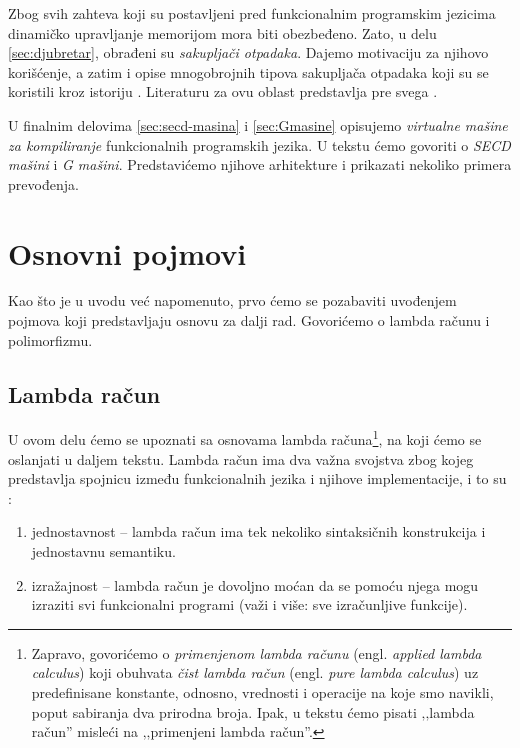 \documentclass[a4paper]{article}
\begin{document}
Zbog svih zahteva koji su postavljeni pred funkcionalnim programskim jezicima dinamičko upravljanje memorijom mora biti obezbeđeno. Zato, u delu \ref{sec:djubretar}, obrađeni su \textit{sakupljači otpadaka}. Dajemo motivaciju za njihovo korišćenje, a zatim i opise mnogobrojnih tipova sakupljača otpadaka koji su se koristili kroz istoriju \cite{appel, mcca60, col60, feni69, app87}. Literaturu za ovu oblast predstavlja pre svega \cite{the-implementation-of-functional-programming-languages}.

U finalnim delovima \ref{sec:secd-masina} i \ref{sec:Gmasine} opisujemo \textit{virtualne mašine za kompiliranje} funkcionalnih programskih jezika. U tekstu ćemo govoriti o \textit{SECD mašini} i \textit{G mašini}. Predstavićemo njihove arhitekture i prikazati nekoliko primera prevođenja.



\section{Osnovni pojmovi}
\label{sec:osnovni pojmovi}

Kao što je u uvodu već napomenuto, prvo ćemo se pozabaviti uvođenjem pojmova koji predstavljaju osnovu za dalji rad. Govorićemo o lambda računu i polimorfizmu.

\subsection{Lambda račun}
\label{subsec:lambda racun}


U ovom delu ćemo se upoznati sa osnovama lambda računa\footnote{Zapravo, govorićemo o \textit{primenjenom lambda računu} (engl. \textit{applied lambda calculus}) koji obuhvata \textit{čist lambda račun} (engl. \textit{pure lambda calculus}) uz predefinisane konstante, odnosno, vrednosti i operacije na koje smo navikli, poput sabiranja dva prirodna broja. Ipak, u tekstu ćemo pisati ‚‚lambda račun'' misleći na ‚‚primenjeni lambda račun''.}, na koji ćemo se oslanjati u daljem tekstu. Lambda račun ima dva važna svojstva zbog kojeg predstavlja spojnicu između funkcionalnih jezika i njihove implementacije, i to su \cite{the-implementation-of-functional-programming-languages}:
\begin{enumerate}
	\item jednostavnost -- lambda račun ima tek nekoliko sintaksičnih konstrukcija i jednostavnu semantiku.
	\item izražajnost -- lambda račun je dovoljno moćan da se pomoću njega mogu izraziti svi funkcionalni programi (važi i više: sve izračunljive funkcije).
\end{enumerate}
\end{document}
